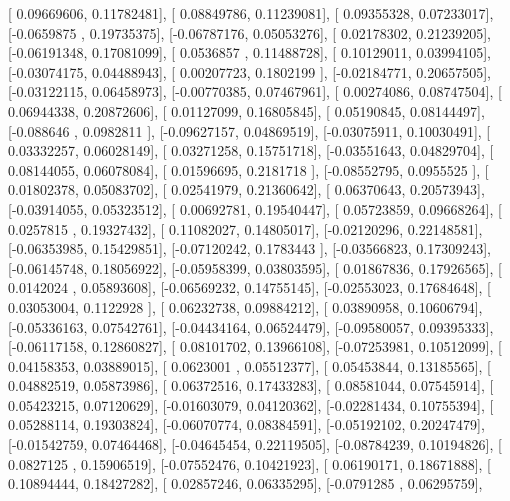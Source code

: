 \documentclass{article}
\begin{document}
       [ 0.09669606,  0.11782481],
       [ 0.08849786,  0.11239081],
       [ 0.09355328,  0.07233017],
       [-0.0659875 ,  0.19735375],
       [-0.06787176,  0.05053276],
       [ 0.02178302,  0.21239205],
       [-0.06191348,  0.17081099],
       [ 0.0536857 ,  0.11488728],
       [ 0.10129011,  0.03994105],
       [-0.03074175,  0.04488943],
       [ 0.00207723,  0.1802199 ],
       [-0.02184771,  0.20657505],
       [-0.03122115,  0.06458973],
       [-0.00770385,  0.07467961],
       [ 0.00274086,  0.08747504],
       [ 0.06944338,  0.20872606],
       [ 0.01127099,  0.16805845],
       [ 0.05190845,  0.08144497],
       [-0.088646  ,  0.0982811 ],
       [-0.09627157,  0.04869519],
       [-0.03075911,  0.10030491],
       [ 0.03332257,  0.06028149],
       [ 0.03271258,  0.15751718],
       [-0.03551643,  0.04829704],
       [ 0.08144055,  0.06078084],
       [ 0.01596695,  0.2181718 ],
       [-0.08552795,  0.0955525 ],
       [ 0.01802378,  0.05083702],
       [ 0.02541979,  0.21360642],
       [ 0.06370643,  0.20573943],
       [-0.03914055,  0.05323512],
       [ 0.00692781,  0.19540447],
       [ 0.05723859,  0.09668264],
       [ 0.0257815 ,  0.19327432],
       [ 0.11082027,  0.14805017],
       [-0.02120296,  0.22148581],
       [-0.06353985,  0.15429851],
       [-0.07120242,  0.1783443 ],
       [-0.03566823,  0.17309243],
       [-0.06145748,  0.18056922],
       [-0.05958399,  0.03803595],
       [ 0.01867836,  0.17926565],
       [ 0.0142024 ,  0.05893608],
       [-0.06569232,  0.14755145],
       [-0.02553023,  0.17684648],
       [ 0.03053004,  0.1122928 ],
       [ 0.06232738,  0.09884212],
       [ 0.03890958,  0.10606794],
       [-0.05336163,  0.07542761],
       [-0.04434164,  0.06524479],
       [-0.09580057,  0.09395333],
       [-0.06117158,  0.12860827],
       [ 0.08101702,  0.13966108],
       [-0.07253981,  0.10512099],
       [ 0.04158353,  0.03889015],
       [ 0.0623001 ,  0.05512377],
       [ 0.05453844,  0.13185565],
       [ 0.04882519,  0.05873986],
       [ 0.06372516,  0.17433283],
       [ 0.08581044,  0.07545914],
       [ 0.05423215,  0.07120629],
       [-0.01603079,  0.04120362],
       [-0.02281434,  0.10755394],
       [ 0.05288114,  0.19303824],
       [-0.06070774,  0.08384591],
       [-0.05192102,  0.20247479],
       [-0.01542759,  0.07464468],
       [-0.04645454,  0.22119505],
       [-0.08784239,  0.10194826],
       [ 0.0827125 ,  0.15906519],
       [-0.07552476,  0.10421923],
       [ 0.06190171,  0.18671888],
       [ 0.10894444,  0.18427282],
       [ 0.02857246,  0.06335295],
       [-0.0791285 ,  0.06295759],
\end{document}
